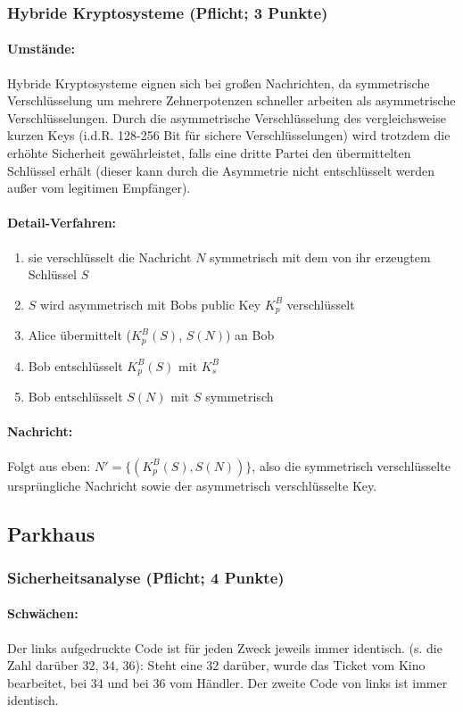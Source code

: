 \documentclass{article}
\begin{document}
\subsubsection{Hybride Kryptosysteme (Pflicht; 3 Punkte)}
\paragraph{Umstände:}
Hybride Kryptosysteme eignen sich bei großen Nachrichten, da symmetrische Verschlüsselung um mehrere Zehnerpotenzen schneller arbeiten als asymmetrische Verschlüsselungen.
Durch die asymmetrische Verschlüsselung des vergleichsweise kurzen Keys (i.d.R. 128-256 Bit für sichere Verschlüsselungen) wird trotzdem die erhöhte Sicherheit gewährleistet, falls eine dritte Partei den übermittelten Schlüssel erhält (dieser kann durch die Asymmetrie nicht entschlüsselt werden außer vom legitimen Empfänger).
\paragraph{Detail-Verfahren:}
\begin{enumerate}
	\item sie verschlüsselt die Nachricht $N$ symmetrisch mit dem von ihr erzeugtem Schlüssel $S$
	\item $S$ wird asymmetrisch mit Bobs public Key $K_p^B$ verschlüsselt
	\item Alice übermittelt ($K_p^B(S)$, $S(N)$) an Bob
	\item Bob entschlüsselt $K_p^B(S)$ mit $K_s^B$
	\item Bob entschlüsselt $S(N)$ mit $S$ symmetrisch
\end{enumerate}
\paragraph{Nachricht:}
Folgt aus eben: $N' = \{(K_p^B(S),S(N))\}$, also die symmetrisch verschlüsselte ursprüngliche Nachricht sowie der asymmetrisch verschlüsselte Key.
\subsection{Parkhaus}
\subsubsection{Sicherheitsanalyse (Pflicht; 4 Punkte)}
\paragraph{Schwächen:}
Der links aufgedruckte Code ist für jeden Zweck jeweils immer identisch. (s. die Zahl darüber 32, 34, 36): Steht eine 32 darüber, wurde das Ticket vom Kino bearbeitet, bei 34 und bei 36 vom Händler.
Der zweite Code von links ist immer identisch.
\end{document}
